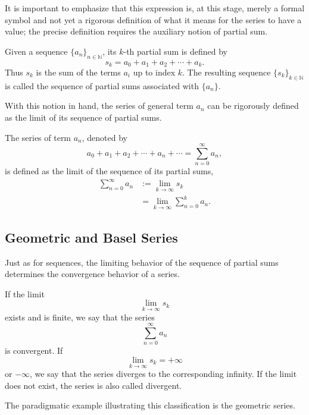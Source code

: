 It is important to emphasize that this expression is, at this stage, merely a formal
symbol and not yet a rigorous definition of what it means for the series to have a value; the precise definition requires the auxiliary notion of partial sum.

\begin{definition}
Given a sequence $\{a_n\}_{n \in \mathbb{N}}$, its $k$-th partial sum is defined by
\[
s_k = a_0 + a_1 + a_2 + \cdots + a_k.
\]
Thus $s_k$ is the sum of the terms $a_i$ up to index $k$. The resulting sequence $\{s_k\}_{k \in \mathbb{N}}$ is called the sequence of partial sums associated with $\{a_n\}$.
\end{definition}

With this notion in hand, the series of general term $a_n$ can be rigorously defined as the limit of its sequence of partial sums.

\begin{definition}[Series]
The series of term $a_n$, denoted by
\[
a_0 + a_1 + a_2 + \cdots + a_n + \cdots = \sum_{n=0}^{\infty} a_n,
\]
is defined as the limit of the sequence of its partial sums,
\[
\begin{aligned}
\sum_{n=0}^{\infty} a_n &:= \lim_{k \to \infty} s_k \\
&= \lim_{k \to \infty} \sum_{n=0}^{k} a_n.
\end{aligned}
\]

\end{definition}

\subsection{Geometric and Basel Series}

Just as for sequences, the limiting behavior of the sequence of partial sums determines the convergence behavior of a series.

\begin{definition}
If the limit \[
\lim_{k \to \infty} s_k
\] exists and is finite, we say that the series \[
\sum_{n=0}^{\infty} a_n
\] is convergent. If \[
\lim_{k \to \infty} s_k = +\infty
\] or $-\infty$, we say that the series diverges to the corresponding infinity. If the limit does not exist, the series is also called divergent.
\end{definition}

The paradigmatic example illustrating this classification is the geometric series.

